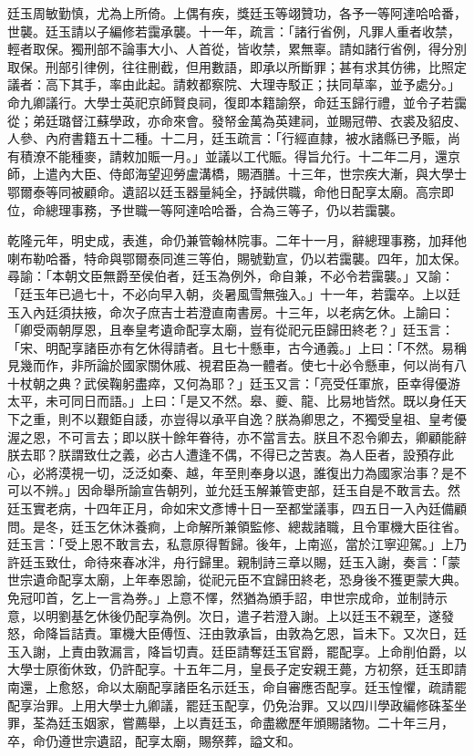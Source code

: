 \begin{pinyinscope}
廷玉周敏勤慎，尤為上所倚。上偶有疾，獎廷玉等翊贊功，各予一等阿達哈哈番，世襲。廷玉請以子編修若靄承襲。十一年，疏言：「諸行省例，凡罪人重者收禁，輕者取保。獨刑部不論事大小、人首從，皆收禁，累無辜。請如諸行省例，得分別取保。刑部引律例，往往刪截，但用數語，即承以所斷罪；甚有求其仿彿，比照定議者：高下其手，率由此起。請敕都察院、大理寺駁正；扶同草率，並予處分。」命九卿議行。大學士英祀京師賢良祠，復即本籍諭祭，命廷玉歸行禮，並令子若靄從；弟廷璐督江蘇學政，亦命來會。發帑金萬為英建祠，並賜冠帶、衣裘及貂皮、人參、內府書籍五十二種。十二月，廷玉疏言：「行經直隸，被水諸縣已予賑，尚有積潦不能種麥，請敕加賑一月。」並議以工代賑。得旨允行。十二年二月，還京師，上遣內大臣、侍郎海望迎勞盧溝橋，賜酒膳。十三年，世宗疾大漸，與大學士鄂爾泰等同被顧命。遺詔以廷玉器量純全，抒誠供職，命他日配享太廟。高宗即位，命總理事務，予世職一等阿達哈哈番，合為三等子，仍以若靄襲。

乾隆元年，明史成，表進，命仍兼管翰林院事。二年十一月，辭總理事務，加拜他喇布勒哈番，特命與鄂爾泰同進三等伯，賜號勤宣，仍以若靄襲。四年，加太保。尋諭：「本朝文臣無爵至侯伯者，廷玉為例外，命自兼，不必令若靄襲。」又諭：「廷玉年已過七十，不必向早入朝，炎暑風雪無強入。」十一年，若靄卒。上以廷玉入內廷須扶掖，命次子庶吉士若澄直南書房。十三年，以老病乞休。上諭曰：「卿受兩朝厚恩，且奉皇考遺命配享太廟，豈有從祀元臣歸田終老？」廷玉言：「宋、明配享諸臣亦有乞休得請者。且七十懸車，古今通義。」上曰：「不然。易稱見幾而作，非所論於國家關休戚、視君臣為一體者。使七十必令懸車，何以尚有八十杖朝之典？武侯鞠躬盡瘁，又何為耶？」廷玉又言：「亮受任軍旅，臣幸得優游太平，未可同日而語。」上曰：「是又不然。皋、夔、龍、比易地皆然。既以身任天下之重，則不以艱鉅自諉，亦豈得以承平自逸？朕為卿思之，不獨受皇祖、皇考優渥之恩，不可言去；即以朕十餘年眷待，亦不當言去。朕且不忍令卿去，卿顧能辭朕去耶？朕謂致仕之義，必古人遭逢不偶，不得已之苦衷。為人臣者，設預存此心，必將漠視一切，泛泛如秦、越，年至則奉身以退，誰復出力為國家治事？是不可以不辨。」因命舉所諭宣告朝列，並允廷玉解兼管吏部，廷玉自是不敢言去。然廷玉實老病，十四年正月，命如宋文彥博十日一至都堂議事，四五日一入內廷備顧問。是冬，廷玉乞休沐養痾，上命解所兼領監修、總裁諸職，且令軍機大臣往省。廷玉言：「受上恩不敢言去，私意原得暫歸。後年，上南巡，當於江寧迎駕。」上乃許廷玉致仕，命待來春冰泮，舟行歸里。親制詩三章以賜，廷玉入謝，奏言：「蒙世宗遺命配享太廟，上年奉恩諭，從祀元臣不宜歸田終老，恐身後不獲更蒙大典。免冠叩首，乞上一言為券。」上意不懌，然猶為頒手詔，申世宗成命，並制詩示意，以明劉基乞休後仍配享為例。次日，遣子若澄入謝。上以廷玉不親至，遂發怒，命降旨詰責。軍機大臣傅恆、汪由敦承旨，由敦為乞恩，旨未下。又次日，廷玉入謝，上責由敦漏言，降旨切責。廷臣請奪廷玉官爵，罷配享。上命削伯爵，以大學士原銜休致，仍許配享。十五年二月，皇長子定安親王薨，方初祭，廷玉即請南還，上愈怒，命以太廟配享諸臣名示廷玉，命自審應否配享。廷玉惶懼，疏請罷配享治罪。上用大學士九卿議，罷廷玉配享，仍免治罪。又以四川學政編修硃荃坐罪，荃為廷玉姻家，嘗薦舉，上以責廷玉，命盡繳歷年頒賜諸物。二十年三月，卒，命仍遵世宗遺詔，配享太廟，賜祭葬，謚文和。


\end{pinyinscope}
